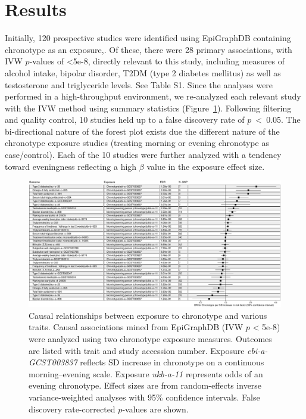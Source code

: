 \documentclass[genes,article,accept,moreauthors,pdftex]{Definitions/mdpi}
\begin{document}
\section{Results}
Initially, 120 prospective studies were identified using EpiGraphDB containing chronotype as an exposure,. Of these, there were 28 primary associations, with IVW $p$-values of <5e-8, directly relevant to this study, including measures of alcohol intake, bipolar disorder, T2DM (type 2 diabetes mellitus) as well as testosterone and triglyceride levels. See {Table S1}. Since the analyses were performed in a high-throughput environment, we re-analyzed each relevant study with the IVW method using summary statistics (\mbox{Figure~\ref{forestIVW}}). Following filtering and quality control, 10 studies held up to a false discovery rate of \mbox{$p$ < 0.05}. The bi-directional nature of the forest plot exists due the different nature of the chronotype exposure studies (treating morning or evening chronotype as case/control). Each of the 10 studies were further analyzed with a tendency toward eveningness reflecting a high $\beta$ value in the exposure effect size. 
\begin{figure}[H]
	\includegraphics[width=0.95\linewidth]{Figs/Analysis1/new_forestIVW1a.pdf}
	\caption{Causal relationships between exposure to chronotype and various traits. Causal associations mined from EpiGraphDB (IVW $p$ < 5e-8) were analyzed using two chronotype exposure measures. Outcomes are listed with trait and study accession number. Exposure \textit{ebi-a-GCST003837} reflects SD increase in chronotype on a continuous morning--evening scale. Exposure \textit{ukb-a-11} represents odds of an evening chronotype. Effect sizes are from {random}-effects inverse variance-weighted analyses with 95\% confidence intervals. False discovery rate-corrected $p$-values are shown.}
	\label{forestIVW}
\end{figure}
\end{document}
